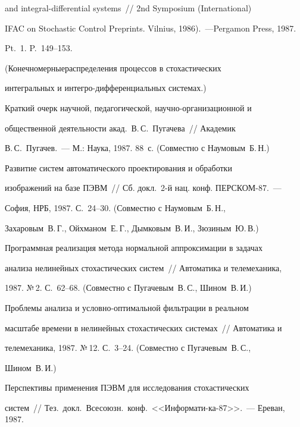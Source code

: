  and integral-differential systems~// 2nd Symposium (In\-ter\-na\-tion\-al) 


 IFAC on Stochastic Control Preprints. Vilnius, 1986).~---\linebreak Pergamon Press, 1987.


Pt.~1. P.~149--153.


(Конечномерные\linebreak распределения процессов в стохастических


интегральных и ин\-тег\-ро-диф\-фе\-рен\-циальных системах.)





 Краткий очерк научной, педагогической, научно-ор\-га\-ни\-за\-ци\-он\-ной и


общественной деятельности акад.\ В.\,С.~Пугачева~// Академик


В.\,С.~Пугачев.~--- М.: Наука, 1987. 88~с. (Совместно с Наумовым~Б.\,Н.)





 Развитие систем автоматического проектирования и обработки


изображений на базе ПЭВМ~// Сб. докл.\ 2-й нац. конф. ПЕРСКОМ-87.~---


София, НРБ, 1987. С.~24--30. (Совместно с Наумовым~Б.\,Н.,


Захаровым~В.\,Г., Ойхманом~Е.\,Г., Дымковым~В.\,И., Зюзиным~Ю.\,В.)





 Программная реализация метода нормальной аппроксимации в задачах


анализа нелинейных стохастических систем~// Автоматика и телемеханика,


1987. №\,2. С.~62--68. (Совместно с Пугачевым~В.\,С., Шином~В.\,И.)





 Проблемы анализа и условно-оптимальной фильтрации в реальном


масштабе времени в нелинейных стохастических системах~// Автоматика и


телемеханика, 1987. №\,12. С.~3--24. (Совместно с Пугачевым~В.\,С.,


Шином~В.\,И.)





 Перспективы применения ПЭВМ для исследования стохастических


систем~// Тез.\ докл.\ Всесоюзн.\ конф.\ <<Информати-\linebreak ка-87>>.~--- Ереван, 1987.



